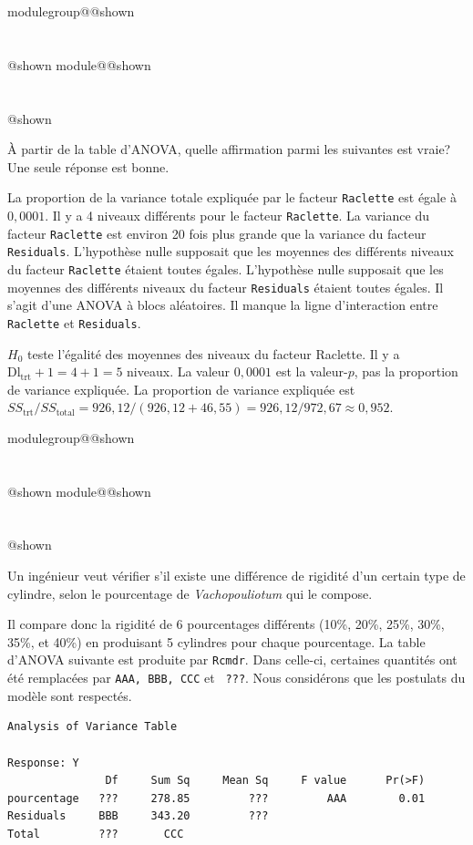 \documentclass{Evaluation}
\makeatletter
\newcommand{\currentmodulekey}{}
\newcommand{\currentmoduletitle}{}
\newcommand{\currentgroupkey}{}
\newcommand{\currentgrouptitle}{}
\newcommand{\showmoduleifneeded}{%
  \ifx\currentgroupkey\empty\else
    \expandafter\ifx\csname modulegroup@\currentgroupkey @shown\endcsname\relax
      \section*{\currentgrouptitle}%
      \expandafter\gdef\csname modulegroup@\currentgroupkey @shown\endcsname{1}%
    \fi
  \fi
  \expandafter\ifx\csname module@\currentmodulekey @shown\endcsname\relax
    \section*{\currentmoduletitle}%
    \expandafter\gdef\csname module@\currentmodulekey @shown\endcsname{1}%
  \fi
}
\newenvironment{H24}{\showmoduleifneeded}{}
\newenvironment{A24}{\showmoduleifneeded}{}
\makeatother
\begin{document}
\begin{questions}
\begin{H24}
À partir de la table d'ANOVA, quelle affirmation parmi les suivantes est vraie? Une seule réponse est bonne.

\begin{checkboxes}
\choice La proportion de la variance totale expliquée par le facteur \texttt{Raclette} est égale à $0,0001$.
\choice Il y a 4 niveaux différents pour le facteur \texttt{Raclette}.
\choice La variance du facteur \texttt{Raclette} est environ 20 fois plus grande que la variance du facteur \texttt{Residuals}.
\correctchoice L'hypothèse nulle supposait que les moyennes des différents niveaux du facteur \texttt{Raclette} étaient toutes égales.
\choice L'hypothèse nulle supposait que les moyennes des différents niveaux du facteur \texttt{Residuals} étaient toutes égales.
\choice Il s'agit d'une ANOVA à blocs aléatoires.
\choice Il manque la ligne d'interaction entre \texttt{Raclette} et \texttt{Residuals}.
\end{checkboxes}

\begin{solution}
$H_0$ teste l'égalité des moyennes des niveaux du facteur Raclette. Il y a $\text{Dl}_{\text{trt}}+1 = 4+1 = 5$ niveaux. La valeur $0{,}0001$ est la valeur-$p$, pas la proportion de variance expliquée. La proportion de variance expliquée est $SS_{\text{trt}}/SS_{\text{total}} = 926{,}12/(926{,}12+46{,}55) = 926{,}12/972{,}67 \approx 0{,}952$.
\end{solution}
\end{H24}

\begin{A24}
\question {} %
Un ingénieur veut vérifier s'il existe une différence de rigidité d'un certain type de cylindre, selon le pourcentage de \textit{Vachopouliotum} qui le compose.

Il compare donc la rigidité de 6 pourcentages différents (10\%, 20\%, 25\%, 30\%, 35\%, et 40\%) en produisant 5 cylindres pour chaque pourcentage.
La table d'ANOVA suivante est produite par \texttt{Rcmdr}.
Dans celle-ci, certaines quantités ont été remplacées par \texttt{AAA, BBB, CCC} et \texttt{ ???}. Nous considérons que les postulats du modèle sont respectés.
\begin{verbatim}
Analysis of Variance Table

Response: Y
               Df     Sum Sq     Mean Sq     F value      Pr(>F)
pourcentage   ???     278.85         ???         AAA        0.01
Residuals     BBB     343.20         ???
Total         ???       CCC
\end{verbatim}


\end{A24}
\end{questions}
\end{document}
